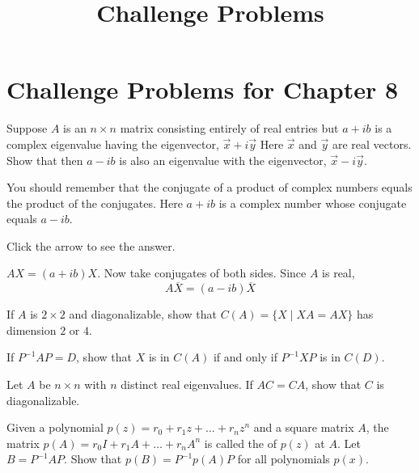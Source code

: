 \documentclass{ximera}
\title{Challenge Problems} \license{CC BY-NC-SA 4.0}
\begin{document}
\begin{abstract}
\end{abstract}
\maketitle

\section*{Challenge Problems for Chapter 8}

\begin{problem}\label{prb:8.32} Suppose $A$ is an $n\times n$ matrix consisting entirely of real
entries but $a+ib$ is a complex eigenvalue having the eigenvector, $\vec{x}+i\vec{y}$ Here $\vec{x}$ and $\vec{y}$ are real vectors. Show
that then $a-ib$ is also an eigenvalue with the eigenvector, $\vec{x}-i\vec{y}$.

\begin{hint}
You should remember that the conjugate of a
product of complex numbers equals the product of the conjugates. Here $a+ib$
is a complex number whose conjugate equals $a-ib.$


Click the arrow to see the answer.
\begin{expandable}
$AX=\left(
a+ib\right)X$. Now take conjugates of both sides. Since $A$ is
real,
\[
A\overline{X}=\left( a-ib\right) \overline{X}
\]
\end{expandable}
 
\end{hint}
\end{problem}



\begin{problem}\label{prb:2x2diagonalizable}
If $A$ is $2 \times 2$ and diagonalizable, show that $C(A) = \{X \mid XA = AX\}$ has dimension $2$ or $4$. 
\begin{hint}
If $P^{-1}AP = D$, show that $X$ is in $C(A)$ if and only if $P^{-1}XP$ is in $C(D)$.
\end{hint}
\end{problem}

\begin{problem}\label{prob:real_ew_commuting}
Let $A$ be $n \times n$ with $n$ distinct real eigenvalues. If $AC = CA$, show that $C$ is diagonalizable.
\end{problem}

\begin{problem}\label{prob:similar_poly_eval}
Given a polynomial $p(z) = r_{0} + r_{1}z + \dots + r_{n}z^{n}$ and a square matrix $A$, the matrix $p(A) = r_{0}I + r_{1}A + \dots  + r_{n}A^{n}$ is called the  of $p(z)$ at $A$. Let $B = P^{-1}AP$. Show that $p(B) = P^{-1}p(A)P$ for all polynomials $p(x)$.
\end{problem}
\end{document}
